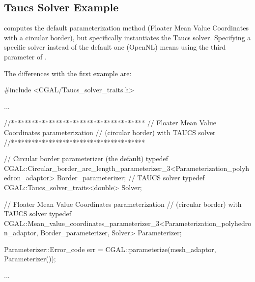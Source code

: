 \subsection{{\sc Taucs} Solver Example}

 computes the default parameterization
method (Floater Mean Value Coordinates with a circular border), but
specifically instantiates the {\sc Taucs} solver.
Specifying a specific solver
instead of the default one (OpenNL) means using the third parameter of
.

The differences with the first example  are:

\begin{ccExampleCode}

#include <CGAL/Taucs_solver_traits.h>

...

//***************************************
// Floater Mean Value Coordinates parameterization
// (circular border) with TAUCS solver
//***************************************

// Circular border parameterizer (the default)
typedef CGAL::Circular_border_arc_length_parameterizer_3<Parameterization_polyhedron_adaptor>
                                                    Border_parameterizer;
// TAUCS solver
typedef CGAL::Taucs_solver_traits<double>           Solver;

// Floater Mean Value Coordinates parameterization
// (circular border) with TAUCS solver
typedef CGAL::Mean_value_coordinates_parameterizer_3<Parameterization_polyhedron_adaptor,
                                                        Border_parameterizer,
                                                        Solver>
                                                    Parameterizer;

Parameterizer::Error_code err = CGAL::parameterize(mesh_adaptor, Parameterizer());

...

\end{ccExampleCode}

